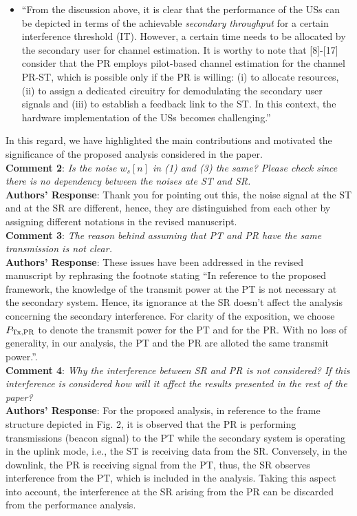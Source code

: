 \documentclass[12pt,a4wide,peerreview]{IEEEtran}
\newcommand{\tc}[1]{#1}
\begin{document}
\begin{itemize}
\item ``From the discussion above, it is clear that the performance of the USs can be depicted in terms of the achievable \textit{secondary throughput} for a certain interference threshold (IT). However, a certain time needs to be allocated by the secondary user for channel estimation. It is worthy to note that [8]-[17] consider that the PR employs pilot-based channel estimation for the channel PR-ST, which is possible only if the PR is willing: (i) to allocate resources, (ii) to assign a dedicated circuitry for demodulating the secondary user signals and (iii) to establish a feedback link to the ST. In this context, the hardware implementation of the USs becomes challenging.''
\end{itemize}
 In this regard, we have highlighted the main contributions and motivated the significance of the proposed analysis considered in the paper. 
\\
\textbf{\tc{Comment 2}}: 
\textit{
Is the noise $w_s[n]$ in (1) and (3) the same? Please check since there is no dependency between the noises ate ST and SR.
}
\\
\textbf{Authors' Response}:
Thank you for pointing out this, the noise signal at the ST and at the SR are different, hence, they are distinguished from each other by assigning different notations in the revised manuscript.
\\
\textbf{\tc{Comment 3}}: 
\textit{
The reason behind assuming that PT and PR have the same transmission is not clear.
}
\\
\textbf{Authors' Response}:
These issues have been addressed in the revised manuscript by rephrasing the footnote stating ``In reference to the proposed framework, the knowledge of the transmit power at the PT is not necessary at the secondary system. Hence, its ignorance at the SR doesn't affect the analysis concerning the secondary interference. For clarity of the exposition, we choose $P_{\text{Tx,PR}}$ to denote the transmit power for the PT and for the PR. With no loss of generality, in our analysis, the PT and the PR are alloted the same transmit power.''.
\\
\textbf{\tc{Comment 4}}: 
\textit{
Why the interference between SR and PR is not considered? If this interference is considered how will it affect the results presented in the rest of the paper?
}
\\
\textbf{Authors' Response}:
For the proposed analysis, in reference to the frame structure depicted in Fig. 2, it is observed that the PR is performing transmissions (beacon signal) to the PT while the secondary system is operating in the uplink mode, i.e., the ST is receiving data from the SR. Conversely, in the downlink, the PR is receiving signal from the PT, thus, the SR observes interference from the PT, which is included in the analysis. Taking this aspect into account, the interference at the SR arising from the PR can be discarded from the performance analysis.   
\end{document}
